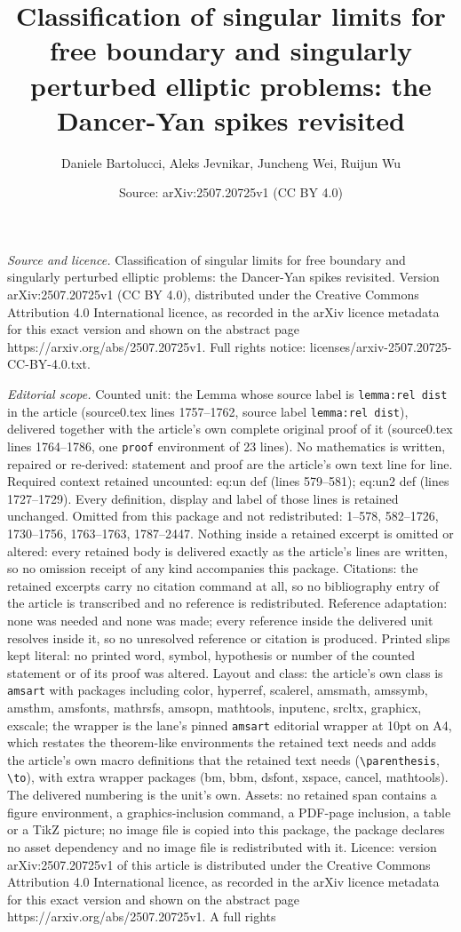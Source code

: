 \documentclass[10pt,a4paper]{amsart}
\title[Classification of singular limits for free boundary and sing]{Classification of singular limits for free boundary and singularly perturbed elliptic problems: the Dancer-Yan spikes revisited}
\author{Daniele Bartolucci, Aleks Jevnikar, Juncheng Wei, Ruijun Wu}
\date{Source: arXiv:2507.20725v1 (CC BY 4.0)}
\begin{document}
\maketitle

\noindent\emph{Source and licence.} Classification of singular limits for free boundary and singularly perturbed elliptic problems: the Dancer-Yan spikes revisited. Version arXiv:2507.20725v1 (CC BY 4.0), distributed under the Creative Commons Attribution 4.0 International licence, as recorded in the arXiv licence metadata for this exact version and shown on the abstract page https://arxiv.org/abs/2507.20725v1. Full rights notice: licenses/arxiv-2507.20725-CC-BY-4.0.txt.\par\smallskip

\noindent\textit{Editorial scope.} Counted unit: the Lemma whose source label is \texttt{lemma:rel dist} in the article (source0.tex lines 1757--1762, source label \texttt{lemma:rel dist}), delivered together with the article's own complete original proof of it (source0.tex lines 1764--1786, one \texttt{proof} environment of 23 lines). No mathematics is written, repaired or re-derived: statement and proof are the article's own text line for line. Required context retained uncounted: eq:un def (lines 579--581); eq:un2 def (lines 1727--1729). Every definition, display and label of those lines is retained unchanged. Omitted from this package and not redistributed: 1--578, 582--1726, 1730--1756, 1763--1763, 1787--2447. Nothing inside a retained excerpt is omitted or altered: every retained body is delivered exactly as the article's lines are written, so no omission receipt of any kind accompanies this package. Citations: the retained excerpts carry no citation command at all, so no bibliography entry of the article is transcribed and no reference is redistributed. Reference adaptation: none was needed and none was made; every reference inside the delivered unit resolves inside it, so no unresolved reference or citation is produced. Printed slips kept literal: no printed word, symbol, hypothesis or number of the counted statement or of its proof was altered. Layout and class: the article's own class is \texttt{amsart} with packages including color, hyperref, scalerel, amsmath, amssymb, amsthm, amsfonts, mathrsfs, amsopn, mathtools, inputenc, srcltx, graphicx, exscale; the wrapper is the lane's pinned \texttt{amsart} editorial wrapper at 10pt on A4, which restates the theorem-like environments the retained text needs and adds the article's own macro definitions that the retained text needs (\texttt{\textbackslash parenthesis}, \texttt{\textbackslash to}), with extra wrapper packages (bm, bbm, dsfont, xspace, cancel, mathtools). The delivered numbering is the unit's own. Assets: no retained span contains a figure environment, a graphics-inclusion command, a PDF-page inclusion, a table or a TikZ picture; no image file is copied into this package, the package declares no asset dependency and no image file is redistributed with it. Licence: version arXiv:2507.20725v1 of this article is distributed under the Creative Commons Attribution 4.0 International licence, as recorded in the arXiv licence metadata for this exact version and shown on the abstract page https://arxiv.org/abs/2507.20725v1. A full rights 
\end{document}
